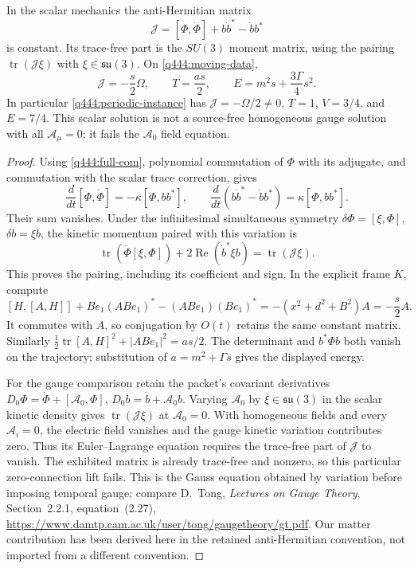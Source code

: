\begin{proposition}\label{q444:charge}
In the scalar mechanics the anti-Hermitian matrix
\begin{equation}\label{q444:moment}
 \mathcal J=[\Phi,\dot\Phi]+b\dot b^*-\dot b b^*
\end{equation}
is constant. Its trace-free part is the $SU(3)$ moment matrix, using the
pairing $\operatorname{tr}(\mathcal J\xi)$ with
$\xi\in\mathfrak{su}(3)$. On \eqref{q444:moving-data},
\[
 \mathcal J=-\frac s2\Omega,
 \qquad T=\frac{as}{2},\qquad
 E=m^2s+\frac{3\Gamma}{4}s^2.
\]
In particular \eqref{q444:periodic-instance} has
$\mathcal J=-\Omega/2\ne0$, $T=1$, $V=3/4$, and $E=7/4$.
This scalar solution is not a source-free homogeneous gauge solution
with all $\mathcal A_\mu=0$: it fails the $\mathcal A_0$ field equation.
\end{proposition}
\begin{proof}
Using \eqref{q444:full-eom}, polynomial commutation of $\Phi$ with its
adjugate, and commutation with the scalar trace correction, gives
\[
 \frac{d}{dt}[\Phi,\dot\Phi]=-\kappa[\Phi,bb^*],\qquad
 \frac{d}{dt}(b\dot b^*-\dot b b^*)=\kappa[\Phi,bb^*].
\]
Their sum vanishes. Under the infinitesimal simultaneous symmetry
$\delta\Phi=[\xi,\Phi]$, $\delta b=\xi b$, the kinetic momentum paired
with this variation is
\[
 \operatorname{tr}(\dot\Phi[\xi,\Phi])
       +2\operatorname{Re}(\dot b^*\xi b)
       =\operatorname{tr}(\mathcal J\xi).
\]
This proves the pairing, including its coefficient and sign.
In the explicit frame $K$, compute
\[
 [H,[A,H]]+Be_1(ABe_1)^*-(ABe_1)(Be_1)^*
       =-(x^2+d^2+B^2)A=-\frac s2 A.
\]
It commutes with $A$, so conjugation by $O(t)$ retains the same constant
matrix. Similarly
$\tfrac12\operatorname{tr}[A,H]^2+|ABe_1|^2=as/2$.
The determinant and $b^*\Phi b$ both vanish on the trajectory; substitution
of $a=m^2+\Gamma s$ gives the displayed energy.

For the gauge comparison retain the packet's covariant derivatives
$D_0\Phi=\dot\Phi+[\mathcal A_0,\Phi]$,
$D_0b=\dot b+\mathcal A_0b$. Varying $\mathcal A_0$ by
$\xi\in\mathfrak{su}(3)$ in the scalar kinetic density gives
$\operatorname{tr}(\mathcal J\xi)$ at $\mathcal A_0=0$.
With homogeneous fields and every $\mathcal A_i=0$, the electric field
vanishes and the gauge kinetic variation contributes zero. Thus its
Euler--Lagrange equation requires the trace-free part of $\mathcal J$ to
vanish. The exhibited matrix is already trace-free and nonzero, so this
particular zero-connection lift fails. This is the Gauss equation obtained
by variation before imposing temporal gauge; compare D.~Tong,
\emph{Lectures on Gauge Theory}, Section~2.2.1, equation~(2.27),
\url{https://www.damtp.cam.ac.uk/user/tong/gaugetheory/gt.pdf}.
Our matter contribution has been derived here in the retained
anti-Hermitian convention, not imported from a different convention.
\end{proof}


